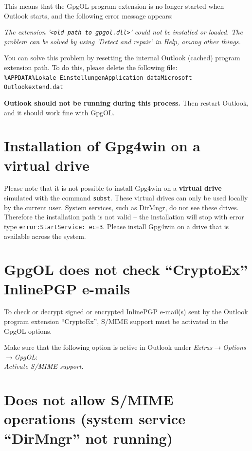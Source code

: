 \documentclass[a4paper,11pt,oneside,openright,titlepage]{scrbook}
\newcommand{\Menu}[1]{\textit{#1}}
\newcommand{\Filename}[1]{\small{\texttt{#1}}\normalsize}
\newcommand{\Email}{e-mail}
\begin{document}
This means that the GpgOL program extension is no longer started when
Outlook starts, and the following error message appears:


\Menu{The extension '\Filename{<old path to gpgol.dll>}' could not be
installed or loaded. The problem can be solved by using 'Detect and
repair' in Help, among other things.}

You can solve this problem by resetting the internal Outlook (cached)
program extension path. To do this, please delete the following
file:\\
\Filename{\%APPDATA\%\back{}Lokale
Einstellungen\back{}Application data\back{}Microsoft\back{}\\
Outlook\back{}extend.dat}

\textbf{Outlook should not be running during this process.} Then
restart Outlook, and it should work fine with GpgOL.


\section{Installation of Gpg4win on a virtual drive}

Please note that it is not possible to install Gpg4win on a
\textbf{virtual drive} simulated with the command \Filename{subst}.
These virtual drives can only be used locally by the current user.
System services, such as DirMngr, do not see these drives. Therefore
the installation path is not valid -- the installation will stop with
error type  \Filename{error:StartService: ec=3}. Please
install Gpg4win on a drive that is available across the system.


\section{GpgOL does not check ``CryptoEx'' InlinePGP \Email{}s}

To check or decrypt signed or encrypted InlinePGP \Email{}(s) sent by
the Outlook program extension ``CryptoEx'', S/MIME support must be
activated in the GpgOL options.

Make sure that the following option is active in Outlook under
\Menu{Extras$\rightarrow$Options$\rightarrow$GpgOL}:\\ \Menu{Activate
S/MIME support}.


\clearpage
\section{Does not allow S/MIME operations (system service
``DirMngr'' not running)}
\label{dirmngr-restart}
\end{document}
